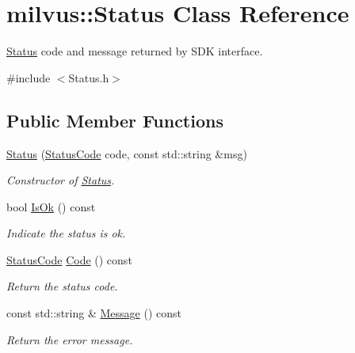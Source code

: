 \hypertarget{classmilvus_1_1_status}{}\section{milvus\+:\+:Status Class Reference}
\label{classmilvus_1_1_status}


\hyperlink{classmilvus_1_1_status}{Status} code and message returned by S\+DK interface.  




{\ttfamily \#include $<$Status.\+h$>$}

\subsection*{Public Member Functions}
\begin{DoxyCompactItemize}
\item 
\mbox{\label{classmilvus_1_1_status_a13cdea01cedc62e34ed7eb2b88467468}} 
\hyperlink{classmilvus_1_1_status_a13cdea01cedc62e34ed7eb2b88467468}{Status} (\hyperlink{namespacemilvus_ad8f8a6a0abb456a62ed9fec3f2ff1f23}{Status\+Code} code, const std\+::string \&msg)
\begin{DoxyCompactList}\small\item\em Constructor of \hyperlink{classmilvus_1_1_status}{Status}. \end{DoxyCompactList}\item 
\mbox{\label{classmilvus_1_1_status_af59a4a5d84d08b6c0840b36909ccb0cc}} 
bool \hyperlink{classmilvus_1_1_status_af59a4a5d84d08b6c0840b36909ccb0cc}{Is\+Ok} () const
\begin{DoxyCompactList}\small\item\em Indicate the status is ok. \end{DoxyCompactList}\item 
\mbox{\label{classmilvus_1_1_status_a0e4901da3d451686abeaf1cc3d7847c2}} 
\hyperlink{namespacemilvus_ad8f8a6a0abb456a62ed9fec3f2ff1f23}{Status\+Code} \hyperlink{classmilvus_1_1_status_a0e4901da3d451686abeaf1cc3d7847c2}{Code} () const
\begin{DoxyCompactList}\small\item\em Return the status code. \end{DoxyCompactList}\item 
\mbox{\label{classmilvus_1_1_status_a411b3c769fc95da8479c9bd615d3eebc}} 
const std\+::string \& \hyperlink{classmilvus_1_1_status_a411b3c769fc95da8479c9bd615d3eebc}{Message} () const
\begin{DoxyCompactList}\small\item\em Return the error message. \end{DoxyCompactList}\end{DoxyCompactItemize}
